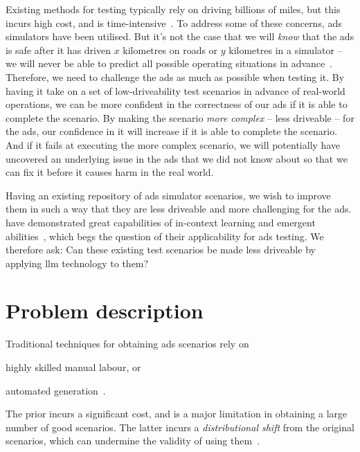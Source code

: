 Existing methods for testing  typically rely on driving billions of miles, but this
incurs high cost, and is time-intensive~\cite[1]{surveyLLMScenarioBasedTesting}. To address some
of these concerns, \acrshort{ads} simulators have been utilised. But it's not the case that we will
\emph{know} that the \acrshort{ads} is safe after it has driven $x$ kilometres on roads or
$y$ kilometres in a simulator -- we will never be able to predict all possible operating
situations in advance~\cite[1]{leahy2024grandchallenge}.
Therefore, we need to challenge the \acrshort{ads} as much as possible when testing it. By having it
take on a set of low-driveability test scenarios in advance of real-world operations,
we can be more confident in the correctness of our \acrshort{ads} if it is able to complete the
scenario. By making the scenario \emph{more complex} -- less driveable -- for
the \acrshort{ads}, our confidence in it will increase if it is able to complete the scenario. And
if it fails at executing the more complex scenario, we will potentially have uncovered an
underlying issue in the \acrshort{ads} that we did not know about so that we can fix it before it
causes harm in the real world.

Having an existing repository of \acrshort{ads} simulator scenarios, we wish to improve
them in such a way that they are less driveable and more challenging for the \acrshort{ads}.
 have demonstrated great capabilities of in-context learning and emergent
abilities~\cite[1]{LLM4AD}, which begs the question of their applicability for \acrshort{ads}
testing. We therefore ask: Can these existing test scenarios be made less driveable by applying
\acrshort{llm} technology to them?

\section{Problem description}\label{sec:problemDescription}

Traditional techniques for obtaining \acrshort{ads} scenarios rely on
\begin{inparaenum}
    \item highly skilled manual labour, or
    \item automated generation~\cite[1]{yao2025agentsllm}.
\end{inparaenum}
The prior incurs a significant cost, and is a major limitation in obtaining a large number of good
scenarios. The latter incurs a \emph{distributional shift} from the original scenarios, which can
undermine the validity of using them~\cite[1]{yao2025agentsllm}.

